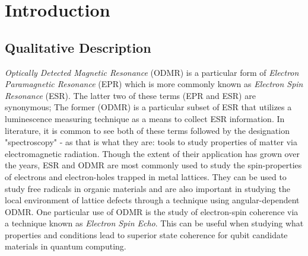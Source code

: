 \documentclass[oneside, astronomy, noacknowlegments]{BYUPhys}
\begin{document}
 \frontmatter

 \makepreliminarypages

 \tableofcontents

 \mainmatter

\listoffigures 


\chapter{Introduction}

\section{Qualitative Description}
\label{sec:Qualitative}

\textit{Optically Detected Magnetic Resonance} (ODMR) is a particular form of \textit{Electron Paramagnetic Resonance} (EPR) which is more commonly known as \textit{Electron Spin Resonance} (ESR). The latter two of these terms (EPR and ESR) are synonymous; The former (ODMR) is a particular subset of ESR that utilizes a luminescence measuring technique as a means to collect ESR information. In literature, it is common to see both of these terms followed by the designation "spectroscopy" - as that is what they are: tools to study properties of matter via electromagnetic radiation. Though the extent of their application has grown over the years, ESR and ODMR are most commonly used to study the spin-properties of electrons and electron-holes trapped in metal lattices. They can be used to study free radicals in organic materials and are also important in studying the local environment of lattice defects through a technique using angular-dependent ODMR. One particular use of ODMR is the study of electron-spin coherence via a technique known as \textit{Electron Spin Echo}. This can be useful when studying what properties and conditions lead to superior state coherence for qubit candidate materials in quantum computing.
\end{document}
